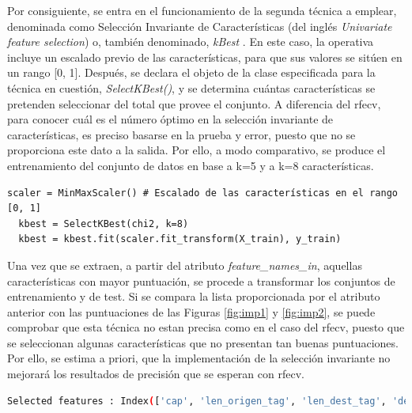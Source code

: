 Por consiguiente, se entra en el funcionamiento de la segunda técnica a emplear, denominada como Selección Invariante de Características (del inglés \textit{Univariate feature selection}) o, también denominado, \textit{kBest} \cite{kbest}. En este caso, la operativa incluye un escalado previo de las características, para que sus valores se sitúen en un rango [0, 1]. Después, se declara el objeto de la clase especificada para la técnica en cuestión, \textit{SelectKBest()}, y se determina cuántas características se pretenden seleccionar del total que provee el conjunto. A diferencia del \gls{rfecv}, para conocer cuál es el número óptimo en la selección invariante de características, es preciso basarse en la prueba y error, puesto que no se proporciona este dato a la salida. Por ello, a modo comparativo, se produce el entrenamiento del conjunto de datos en base a k=5 y a k=8 características. 

\vspace{3mm}

\begin{lstlisting}[style=Python, caption={Aplicación del \textit{kBest}}]
  scaler = MinMaxScaler() # Escalado de las características en el rango [0, 1]
  kbest = SelectKBest(chi2, k=8)
  kbest = kbest.fit(scaler.fit_transform(X_train), y_train)
\end{lstlisting}

\vspace{3mm}

Una vez que se extraen, a partir del atributo \textit{feature\_names\_in}, aquellas características con mayor puntuación, se procede a transformar los conjuntos de entrenamiento y de test. Si se compara la lista proporcionada por el atributo anterior con las puntuaciones de las Figuras \ref{fig:imp1} y \ref{fig:imp2}, se puede comprobar que esta técnica no estan precisa como en el caso del \gls{rfecv}, puesto que se seleccionan algunas características que no presentan tan buenas puntuaciones. Por ello, se estima a priori, que la implementación de la selección invariante no mejorará los resultados de precisión que se esperan con \gls{rfecv}.

\vspace{3mm}

\begin{lstlisting}[language=bash, style=Python, caption={Resultados del \textit{kBest} para \textit{k=8}}]
  Selected features : Index(['cap', 'len_origen_tag', 'len_dest_tag', 'degree', 'abs_flux', 'Beam Irradiance (W/m2)', 'Plane of Array Irradiance (W/m2)', 'Cell Temperature (C)'], dtype='object')       
\end{lstlisting}


